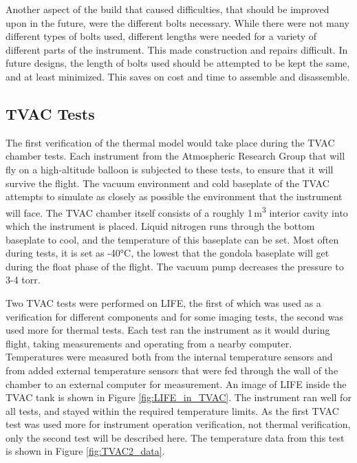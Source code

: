 Another aspect of the build that caused difficulties, that should be improved upon in the future, were the different bolts necessary. While there were not many different types of bolts used, different lengths were needed for a variety of different parts of the instrument. This made construction and repairs difficult. In future designs, the length of bolts used should be attempted to be kept the same, and at least minimized. This saves on cost and time to assemble and disassemble.

\subsection{TVAC Tests}\label{TVAC_tests}
The first verification of the thermal model would take place during the TVAC chamber tests. Each instrument from the Atmospheric Research Group that will fly on a high-altitude balloon is subjected to these tests, to ensure that it will survive the flight. The vacuum environment and cold baseplate of the TVAC attempts to simulate as closely as possible the environment that the instrument will face. The TVAC chamber itself consists of a roughly 1\,m\textsuperscript{3} interior cavity into which the instrument is placed. Liquid nitrogen runs through the bottom baseplate to cool, and the temperature of this baseplate can be set. Most often during tests, it is set as -40°C, the lowest that the gondola baseplate will get during the float phase of the flight. The vacuum pump decreases the pressure to 3-4 torr.

Two TVAC tests were performed on LIFE, the first of which was used as a verification for different components and for some imaging tests, the second was used more for thermal tests. Each test ran the instrument as it would during flight, taking measurements and operating from a nearby computer. Temperatures were measured both from the internal temperature sensors and from added external temperature sensors that were fed through the wall of the chamber to an external computer for measurement. An image of LIFE inside the TVAC tank is shown in Figure \ref{fig:LIFE_in_TVAC}. The instrument ran well for all tests, and stayed within the required temperature limits. As the first TVAC test was used more for instrument operation verification, not thermal verification, only the second test will be described here. The temperature data from this test is shown in Figure \ref{fig:TVAC2_data}.

